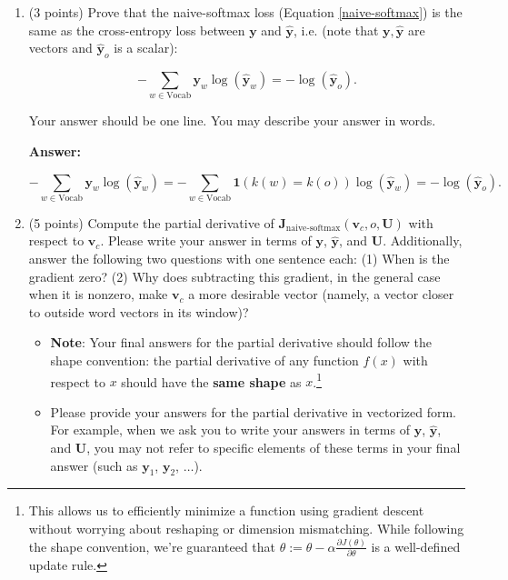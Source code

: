 \documentclass{article}
\newenvironment{answer}{
    {\bf Answer:} \sf \begingroup\color{black}
}{\endgroup}%
\begin{document}
\clearpage
\begin{enumerate}[label=(\alph*)]
    \item (3 points)
          Prove that the naive-softmax loss (Equation \ref{naive-softmax}) is the same as the cross-entropy loss between $\bm y$ and $\hat{\bm y}$, i.e. (note that $\bm y, \hat{\bm y}$ are vectors and $\hat{\bm y}_o$ is a scalar):

          \begin{equation}
              -\sum_{w \in \text{Vocab}} \bm y_w \log(\hat{\bm y}_w) = - \log (\hat{\bm y}_o).
          \end{equation}

          Your answer should be one line. You may describe your answer in words.
          \begin{shaded}
              \begin{answer}
                  \begin{equation}
                      -\sum_{w \in \text{Vocab}} \bm y_w \log(\hat{\bm y}_w) = -\sum_{w \in \text{Vocab}} \bm 1 (k(w) = k(o)) \log(\hat{\bm y}_w) = - \log (\hat{\bm y}_o).
                  \end{equation}
              \end{answer}
          \end{shaded}

    \item (5 points) Compute the partial derivative of $\bm J_{\text{naive-softmax}}(\bm v_c, o, \bm U)$ with respect to $\bm v_c$. Please write your answer in terms of $\bm y$, $\hat{\bm y}$, and $\bm U$. Additionally, answer the following two questions with one sentence each: (1) When is the gradient zero? (2) Why does subtracting this gradient, in the general case when it is nonzero, make $\bm v_c$ a more desirable vector (namely, a vector closer to outside word vectors in its window)?

          \begin{itemize}
              \item \textbf{Note}: Your final answers for the partial derivative should follow the shape convention: the partial derivative of any function $f(x)$ with respect to $x$ should have the \textbf{same shape} as $x$.\footnote{This allows us to efficiently minimize a function using gradient descent without worrying about reshaping or dimension mismatching. While following the shape convention, we're guaranteed that $\theta:= \theta - \alpha\frac{\partial J(\theta)}{\partial \theta}$ is a well-defined update rule.}
              \item Please provide your answers for the partial derivative in vectorized form. For example, when we ask you to write your answers in terms of $\bm y$, $\hat{\bm y}$, and $\bm U$, you may not refer to specific elements of these terms in your final answer (such as $\bm y_1$, $\bm y_2$, $\dots$).
          \end{itemize}


\end{enumerate}
\end{document}
